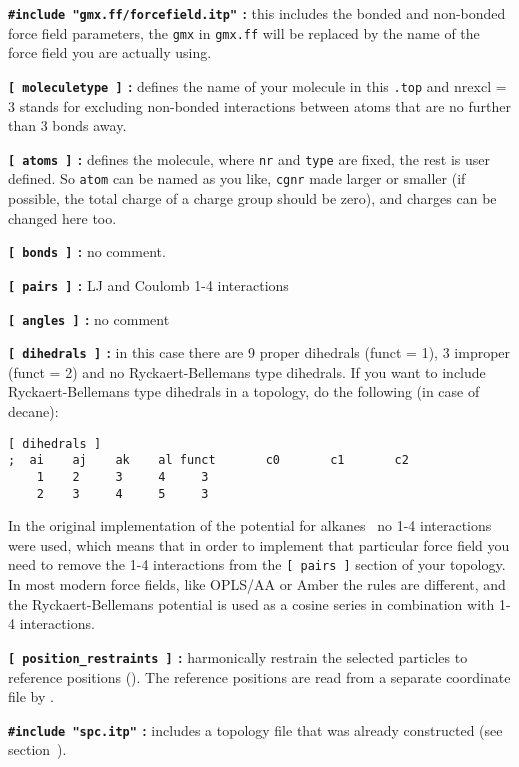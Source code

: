 %

{\bf {\tt \#include "gmx.ff/forcefield.itp"} :} this includes the bonded and
non-bonded force field parameters, the {\tt gmx} in {\tt gmx.ff} will be
replaced by the name of the force field you are actually using.

{\bf {\tt [~moleculetype~]} :} defines the name of your molecule in
this {\tt *.top} and nrexcl = 3 stands for excluding non-bonded
interactions between atoms that are no further than 3 bonds away.

{\bf {\tt [~atoms~]} :} defines the molecule, where {\tt nr} and
{\tt type} are fixed, the rest is user defined. So {\tt atom} can be named
as you like, {\tt cgnr} made larger or smaller (if possible, the total
charge of a charge group should be zero), and charges can be changed
here too.

{\bf {\tt [~bonds~]} :} no comment.

{\bf {\tt [~pairs~]} :} LJ and Coulomb 1-4 interactions

{\bf {\tt [~angles~]} :} no comment

{\bf {\tt [~dihedrals~]} :} in this case there are 9 proper dihedrals
(funct = 1), 3 improper (funct = 2) and no Ryckaert-Bellemans type
dihedrals. If you want to include Ryckaert-Bellemans type dihedrals
in a topology, do the following (in case of {\eg} decane):
\begin{verbatim}
[ dihedrals ]
;  ai    aj    ak    al funct       c0       c1       c2
    1    2     3     4     3 
    2    3     4     5     3
\end{verbatim}
In the original implementation of the potential for
alkanes~\cite{Ryckaert78} no 1-4 interactions were used, which means
that in order to implement that particular force field you need to remove the 1-4
interactions from the {\tt [~pairs~]} section of your topology. In
most modern force fields, like OPLS/AA or Amber the rules are
different, and the Ryckaert-Bellemans potential is used as a cosine
series in combination with 1-4 interactions.

{\bf {\tt [~position_restraints~]} :} harmonically restrain the selected particles
to reference positions (). 
The reference positions are read from a 
separate coordinate file by {\tt {}}.

{\bf {\tt \#include "spc.itp"} :} includes a topology file that was already
constructed (see section~).

